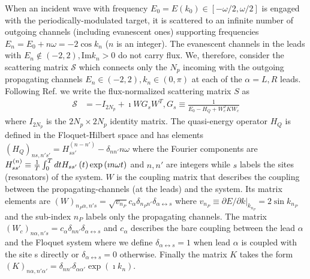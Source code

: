 \documentclass[aps,prl,twocolumn,showpacs,groupedaddress,amsmath,amssymb]{revtex4}
\begin{document}
When an incident wave with frequency $E_0=E(k_0)\in [-\omega/2,\omega/2]$ is engaged with the periodically-modulated target, it is 
scattered to an infinite number of outgoing channels (including evanescent ones) supporting frequencies $E_{n}=E_0+n\omega=-2
\cos k_{n}$ ($n$ is an integer). The evanescent channels in the leads with $E_{n}\notin\left(-2,2\right),\mathrm{Im}k_{n}>0$ do not carry 
flux. We, therefore, consider the scattering matrix $\mathcal{S}$ which connects only the $N_p$ incoming with the outgoing 
propagating channels $E_{n}\in\left(-2,2\right),k_{n}\in\left(0,\pi\right)$ at each of the $\alpha=L,R$ leads. Following Ref. \cite{Li2018} 
we write the flux-normalized scattering matrix $S$ as 
\begin{align}
\mathcal{S} & =-I_{2N_{p}}+\imath WG_{s}W^{T},G_{s}\equiv\frac{1}{E_0-H_{Q}+W_{c}^{T}KW_{c}}
\label{scattering_matrix}
\end{align}
where $I_{2N_{p}}$ is the $2N_{p}\times2N_{p}$ identity matrix. The quasi-energy operator $H_{Q}$ is defined in the Floquet-Hilbert
space and has elements $\left(H_{Q}\right)_{ns,n's'}=H_{ss'}^{\left(n-n'\right)}-\delta_{nn'}n\omega$ where the Fourier components are 
$H_{ss'}^{\left(n\right)}\equiv{1\over T}\int_{0}^{T}dtH_{ss'}\left(t\right)\exp\left(\imath n\omega t\right)$ and $n,n'$ are integers while 
$s$ labels the sites (resonators) of the system. $W$ is the coupling matrix that describes the coupling between the 
propagating-channels (at the leads) and the system. Its matrix elements are $\left(W\right)_{n_{P}\alpha,n's}=\sqrt{v_{n_{P}}}c_{\alpha}
\delta_{n_{P}n'}\delta_{\alpha\leftrightarrow s}$ where $v_{n_{P}}\equiv\left.\partial E/\partial k\right|_{k_{n_{P}}}=2\sin k_{n_{P}}$
and the sub-index $n_{P}$ labels only the propagating channels. The matrix $\left(W_{c}\right)_{n\alpha,n's}=c_{\alpha}\delta_{nn'}
\delta_{\alpha\leftrightarrow s}$ and $c_{\alpha}$ describes the bare coupling between the lead $\alpha$ and the Floquet system
where we define $\delta_{\alpha\leftrightarrow s}=1$ when lead $\alpha$ is coupled with the site s directly or $\delta_{\alpha\leftrightarrow 
s}=0$ otherwise. Finally the matrix $K$ takes the form $\left(K\right)_{n\alpha,n'\alpha'}=\delta_{nn'}\delta_{\alpha\alpha'}
\exp\left(\imath k_{n}\right)$.
\end{document}
